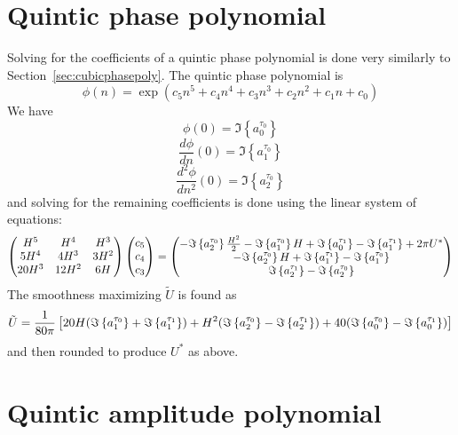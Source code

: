 \section{Quintic phase polynomial\label{sec:quinticphasepoly}}

Solving for the coefficients of a quintic phase polynomial is done very
similarly to Section~\ref{sec:cubicphasepoly}. The quintic phase polynomial is
\begin{equation}
    \label{eq:quinticphasepoly}
    \phi(n) = \exp \left(c_5 n^{5} + c_4 n^{4} + c_3 n^{3} + c_2 n^{2} + c_1 n + c_0 \right)
\end{equation}
We have
\[
    \phi(0) = \Im \left\{ a^{\tau_0}_0 \right\}
\]
\[
    \frac{d \phi}{d n}(0) = \Im \left\{ a^{\tau_0}_1 \right\}
\]
\[
    \frac{d^{2} \phi}{d n^{2}}(0) = \Im \left\{ a^{\tau_0}_2 \right\}
\]
and solving for the remaining coefficients is done using the linear system of
equations:
\begin{equation}
    \begin{pmatrix}
        H^5 & H^4 & H^3 \\
        5 H^4 & 4 H^3 & 3 H^2 \\
        20 H^3 & 12 H^2 & 6 H
    \end{pmatrix}
    \begin{pmatrix}
        c_5 \\
        c_4 \\
        c_3
    \end{pmatrix}
    =
    \begin{pmatrix}
        -\Im \left\{  a^{\tau_0}_2  \right\} \frac{ H^{2} }{2} - \Im \left\{  a^{\tau_0}_1  \right\} H +
            \Im \left\{  a^{\tau_1}_0  \right\} - \Im \left\{  a^{\tau_1}_1  \right\} + 2 \pi U^{\ast}\\
        -\Im \left\{  a^{\tau_0}_2  \right\} H + \Im \left\{  a^{\tau_1}_1  \right\} - \Im \left\{  a^{\tau_0}_1  \right\} \\
        \Im \left\{  a^{\tau_1}_2  \right\} - \Im \left\{  a^{\tau_0}_2  \right\}
    \end{pmatrix}
\end{equation}
The smoothness maximizing $\tilde{U}$ is found as
\[
    \tilde{U} = \frac{1}{80 \pi} \left[ 20 H ( \Im \left\{  a^{\tau_0}_1  \right\} + \Im \left\{  a^{\tau_1}_1  \right\} )
        + H^2 ( \Im \left\{  a^{\tau_0}_2  \right\} - \Im \left\{  a^{\tau_1}_2  \right\} )
        + 40 ( \Im \left\{  a^{\tau_0}_0  \right\} - \Im \left\{  a^{\tau_1}_0  \right\} ) \right]
\]
and then rounded to produce $U^{\ast}$ as above.

\section{Quintic amplitude polynomial}

